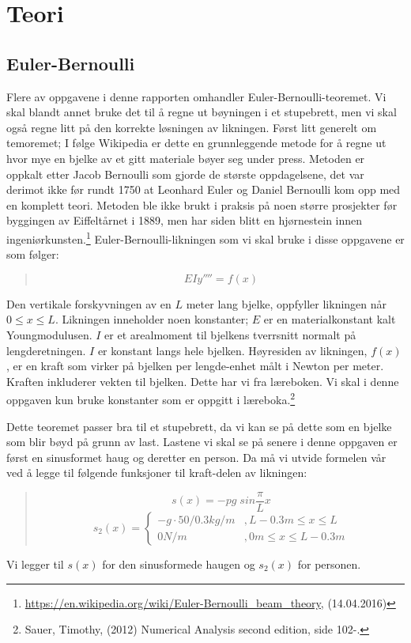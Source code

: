 \section{Teori}

\subsection{Euler-Bernoulli}
Flere av oppgavene i denne rapporten omhandler Euler-Bernoulli-teoremet. Vi skal blandt annet bruke det til å regne ut bøyningen i et stupebrett, men vi skal også regne litt på den korrekte løsningen av likningen. Først litt generelt om temoremet; I følge Wikipedia er dette en grunnleggende metode for å regne ut hvor mye en bjelke av et gitt materiale bøyer seg under press. Metoden er oppkalt etter Jacob Bernoulli som gjorde de største oppdagelsene, det var derimot ikke før rundt 1750 at Leonhard Euler og Daniel Bernoulli kom opp med en komplett teori. Metoden ble ikke brukt i praksis på noen større prosjekter før byggingen av Eiffeltårnet i 1889, men har siden blitt en hjørnestein innen ingeniørkunsten.\footnote{\url{https://en.wikipedia.org/wiki/Euler-Bernoulli_beam_theory}, (14.04.2016)} Euler-Bernoulli-likningen som vi skal bruke i disse oppgavene er som følger:
\begin{quote}
\begin{equation}
EIy''''=f(x)
\end{equation}
\end{quote}

Den vertikale forskyvningen av en $L$ meter lang bjelke, oppfyller likningen når $0\leq x\leq L$. Likningen inneholder noen konstanter; $E$ er en materialkonstant kalt Youngmodulusen. $I$ er et arealmoment til bjelkens tverrsnitt normalt på lengderetningen. $I$ er konstant langs hele bjelken. Høyresiden av likningen, $f(x)$, er en kraft som virker på bjelken per lengde-enhet målt i Newton per meter. Kraften inkluderer vekten til bjelken. Dette har vi fra læreboken. Vi skal i denne oppgaven kun bruke konstanter som er oppgitt i læreboka.\footnote{Sauer, Timothy, (2012) Numerical Analysis second edition, side 102-.}

Dette teoremet passer bra til et stupebrett, da vi kan se på dette som en bjelke som blir bøyd på grunn av last. Lastene vi skal se på senere i denne oppgaven er først en sinusformet haug og deretter en person. Da må vi utvide formelen vår ved å legge til følgende funksjoner til kraft-delen av likningen:
\begin{quote}
\begin{equation}
s(x)=-pg\;sin\frac{\pi}{L}x
\end{equation}
\begin{equation}
s_2(x)=\begin{cases}
	-g\cdot{50/0.3kg/m} & ,L-0.3m\leq x\leq L\\
	0N/m & ,0m\leq x\leq L-0.3m
	\end{cases}
\end{equation}
\end{quote}
Vi legger til $s(x)$ for den sinusformede haugen og $s_2(x)$ for personen. 

